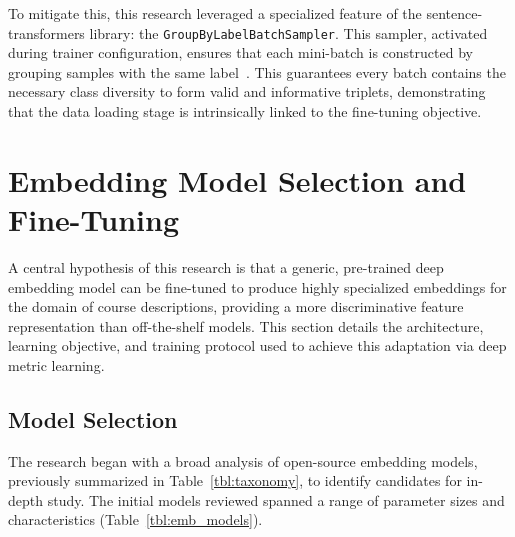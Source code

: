 To mitigate this, this research leveraged a specialized feature of the sentence-transformers library: the \verb|GroupByLabelBatchSampler|. This sampler, activated during trainer configuration, ensures that each mini-batch is constructed by grouping samples with the same label~\cite{sbertSamplers}. This guarantees every batch contains the necessary class diversity to form valid and informative triplets, demonstrating that the data loading stage is intrinsically linked to the fine-tuning objective.

\section{Embedding Model Selection and Fine-Tuning}\label{ch:3.3}
A central hypothesis of this research is that a generic, pre-trained deep embedding model can be fine-tuned to produce highly specialized embeddings for the domain of course descriptions, providing a more discriminative feature representation than off-the-shelf models. This section details the architecture, learning objective, and training protocol used to achieve this adaptation via deep metric learning.

\subsection{Model Selection}\label{ch:3.3.1}
The research began with a broad analysis of open-source embedding models, previously summarized in Table~\ref{tbl:taxonomy}, to identify candidates for in-depth study. The initial models reviewed spanned a range of parameter sizes and characteristics (Table~\ref{tbl:emb_models}).

